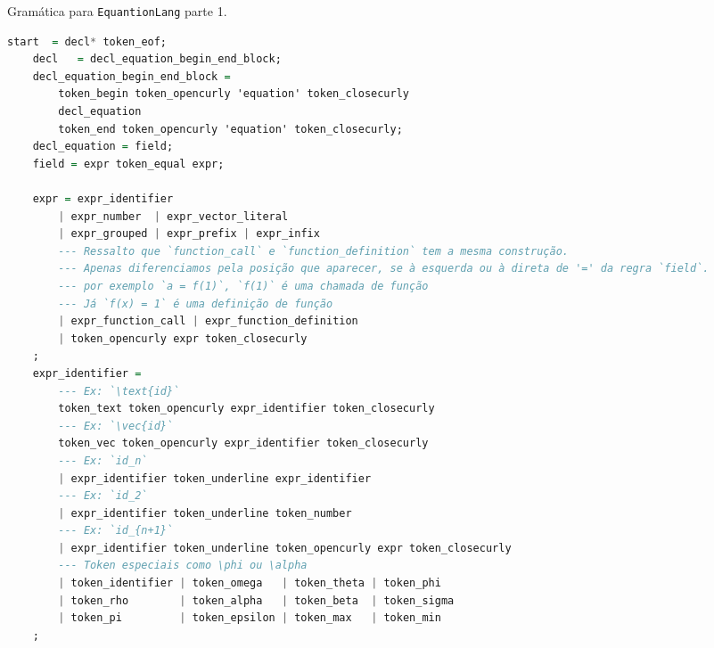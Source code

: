 \begin{codigo}[H]
        \caption{\small Gramática para \texttt{EquantionLang} parte 1.}
        \label{grammar-ast-pt1}
        
\begin{lstlisting}[language=haskell, basicstyle=\ttfamily\footnotesize, numbers=none, inputencoding=utf8]
    start  = decl* token_eof;
    decl   = decl_equation_begin_end_block;
    decl_equation_begin_end_block =
        token_begin token_opencurly 'equation' token_closecurly
        decl_equation
        token_end token_opencurly 'equation' token_closecurly;
    decl_equation = field;
    field = expr token_equal expr;

    expr = expr_identifier
        | expr_number  | expr_vector_literal
        | expr_grouped | expr_prefix | expr_infix
        --- Ressalto que `function_call` e `function_definition` tem a mesma construção.
        --- Apenas diferenciamos pela posição que aparecer, se à esquerda ou à direta de '=' da regra `field`.
        --- por exemplo `a = f(1)`, `f(1)` é uma chamada de função
        --- Já `f(x) = 1` é uma definição de função
        | expr_function_call | expr_function_definition
        | token_opencurly expr token_closecurly
    ;
    expr_identifier =
        --- Ex: `\text{id}`
        token_text token_opencurly expr_identifier token_closecurly
        --- Ex: `\vec{id}`
        token_vec token_opencurly expr_identifier token_closecurly
        --- Ex: `id_n`
        | expr_identifier token_underline expr_identifier
        --- Ex: `id_2`
        | expr_identifier token_underline token_number
        --- Ex: `id_{n+1}`
        | expr_identifier token_underline token_opencurly expr token_closecurly
        --- Token especiais como \phi ou \alpha
        | token_identifier | token_omega   | token_theta | token_phi
        | token_rho        | token_alpha   | token_beta  | token_sigma
        | token_pi         | token_epsilon | token_max   | token_min
    ;

\end{lstlisting}
\end{codigo}

